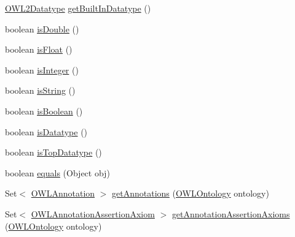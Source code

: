\begin{DoxyCompactItemize}
\item 
\hyperlink{enumorg_1_1semanticweb_1_1owlapi_1_1vocab_1_1_o_w_l2_datatype}{O\-W\-L2\-Datatype} \hyperlink{classuk_1_1ac_1_1manchester_1_1cs_1_1owl_1_1owlapi_1_1_o_w_l_datatype_impl_a32cc8f390f74d178b11c0f36ceaa4391}{get\-Built\-In\-Datatype} ()
\item 
boolean \hyperlink{classuk_1_1ac_1_1manchester_1_1cs_1_1owl_1_1owlapi_1_1_o_w_l_datatype_impl_af30e354dd6df86c17aa65510912e2e55}{is\-Double} ()
\item 
boolean \hyperlink{classuk_1_1ac_1_1manchester_1_1cs_1_1owl_1_1owlapi_1_1_o_w_l_datatype_impl_a992529d035929ea5a9b8034c569c436e}{is\-Float} ()
\item 
boolean \hyperlink{classuk_1_1ac_1_1manchester_1_1cs_1_1owl_1_1owlapi_1_1_o_w_l_datatype_impl_a0792d22c0e657248e72e6b013ae61c92}{is\-Integer} ()
\item 
boolean \hyperlink{classuk_1_1ac_1_1manchester_1_1cs_1_1owl_1_1owlapi_1_1_o_w_l_datatype_impl_a07928d8826bbcab6e1cff3abde62fb20}{is\-String} ()
\item 
boolean \hyperlink{classuk_1_1ac_1_1manchester_1_1cs_1_1owl_1_1owlapi_1_1_o_w_l_datatype_impl_a825b10bba71b21c584866abbd59357fc}{is\-Boolean} ()
\item 
boolean \hyperlink{classuk_1_1ac_1_1manchester_1_1cs_1_1owl_1_1owlapi_1_1_o_w_l_datatype_impl_a24b4e17e98948c31a91cd3c644c83a20}{is\-Datatype} ()
\item 
boolean \hyperlink{classuk_1_1ac_1_1manchester_1_1cs_1_1owl_1_1owlapi_1_1_o_w_l_datatype_impl_a97259e98dbb0ad3d3c5f4b2c8ea9a2f0}{is\-Top\-Datatype} ()
\item 
boolean \hyperlink{classuk_1_1ac_1_1manchester_1_1cs_1_1owl_1_1owlapi_1_1_o_w_l_datatype_impl_a90d5cb5ddf955d5854c1159f0a06e85a}{equals} (Object obj)
\item 
Set$<$ \hyperlink{interfaceorg_1_1semanticweb_1_1owlapi_1_1model_1_1_o_w_l_annotation}{O\-W\-L\-Annotation} $>$ \hyperlink{classuk_1_1ac_1_1manchester_1_1cs_1_1owl_1_1owlapi_1_1_o_w_l_datatype_impl_a4c9fcbfdef69ff1372f5a60bccd666fc}{get\-Annotations} (\hyperlink{interfaceorg_1_1semanticweb_1_1owlapi_1_1model_1_1_o_w_l_ontology}{O\-W\-L\-Ontology} ontology)
\item 
Set$<$ \hyperlink{interfaceorg_1_1semanticweb_1_1owlapi_1_1model_1_1_o_w_l_annotation_assertion_axiom}{O\-W\-L\-Annotation\-Assertion\-Axiom} $>$ \hyperlink{classuk_1_1ac_1_1manchester_1_1cs_1_1owl_1_1owlapi_1_1_o_w_l_datatype_impl_aab74b0e8dc3dcc949b37afe391a9abc4}{get\-Annotation\-Assertion\-Axioms} (\hyperlink{interfaceorg_1_1semanticweb_1_1owlapi_1_1model_1_1_o_w_l_ontology}{O\-W\-L\-Ontology} ontology)

\end{DoxyCompactItemize}
